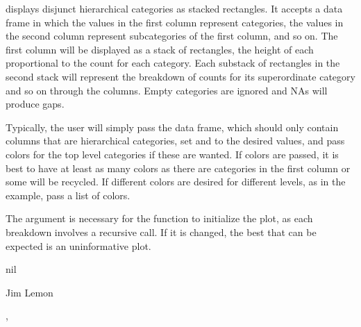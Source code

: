 \begin{Details}\relax
{} displays disjunct hierarchical categories as stacked rectangles.
It accepts a data frame in which the values in the first column represent
categories, the values in the second column represent subcategories of the
first column, and so on. The first column will be displayed as a stack of
rectangles, the height of each proportional to the count for each category.
Each substack of rectangles in the second stack will represent the breakdown
of counts for its superordinate category and so on through the columns.
Empty categories are ignored and NAs will produce gaps.

Typically, the user will simply pass the data frame, which should only
contain columns that are hierarchical categories, set  and
 to the desired values, and pass colors for the top level
categories if these are wanted. If colors are passed, it is best to have at
least as many colors as there are categories in the first column or some will
be recycled. If different colors are desired for different levels, as in the
example, pass a list of colors.

The  argument is necessary for the function to initialize the
plot, as each breakdown involves a recursive call. If it is changed, the best
that can be expected is an uninformative plot.
\end{Details}
\begin{Value}
nil
\end{Value}
\begin{Author}\relax
Jim Lemon
\end{Author}
\begin{SeeAlso}\relax
{},
\end{SeeAlso}
\begin{Examples}
\end{Examples}

